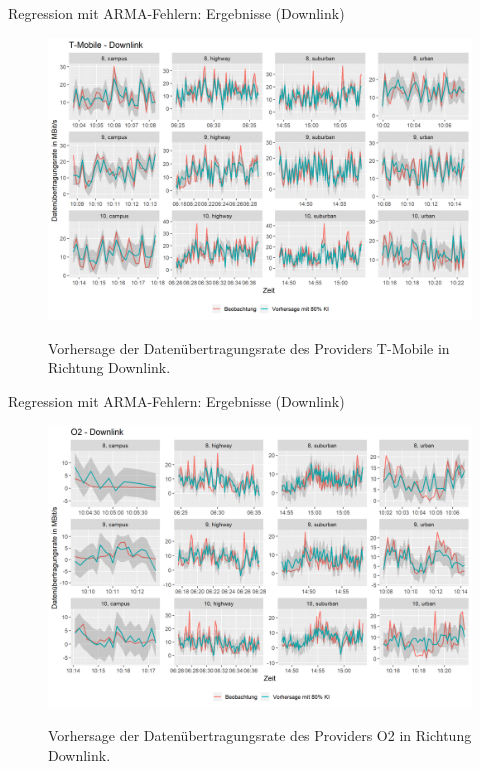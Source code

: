 \begin{frame}{Regression mit ARMA-Fehlern: Ergebnisse (Downlink)}
	\begin{figure}
		\centering
		\includegraphics[scale=0.38]{plots/arima/downlink/tmobile_predictions}\\
		\caption{Vorhersage der Datenübertragungsrate des Providers T-Mobile in Richtung Downlink.}
		\label{tmobile_predictions_dl}
	\end{figure}
\end{frame}

\begin{frame}{Regression mit ARMA-Fehlern: Ergebnisse (Downlink)}
	\begin{figure}
		\centering
		\includegraphics[scale=0.38]{plots/arima/downlink/o2_predictions}\\
		\caption{Vorhersage der Datenübertragungsrate des Providers O2 in Richtung Downlink.}
		\label{o2_predictions_dl}
	\end{figure}
\end{frame}

